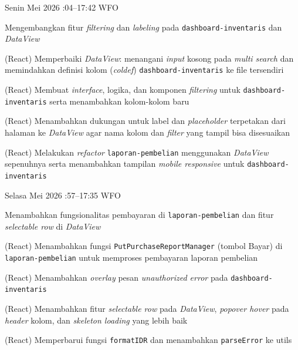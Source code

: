 \begin{logtable}
    {
        Senin  Mei 2026 :04--17:42 \linebreak %
        WFO
    }{
        \begin{loglist}
            \item Mengembangkan fitur \textit{filtering} dan \textit{labeling} pada
            \texttt{dashboard-inventaris} dan \textit{DataView}
        \end{loglist}
    }{
        \begin{logwork}
            \item (React) Memperbaiki \textit{DataView}: menangani \textit{input} kosong pada \textit{multi search} dan memindahkan definisi kolom (\textit{coldef}) \texttt{dashboard-inventaris} ke file tersendiri
            \item (React) Membuat \textit{interface}, logika, dan komponen \textit{filtering} untuk \texttt{dashboard-inventaris} serta menambahkan kolom-kolom baru
            \item (React) Menambahkan dukungan untuk label dan \textit{placeholder} terpetakan dari halaman ke \textit{DataView} agar nama kolom dan \textit{filter} yang tampil bisa disesuaikan
            \item (React) Melakukan \textit{refactor} \texttt{laporan-pembelian} menggunakan \textit{DataView} sepenuhnya serta menambahkan tampilan \textit{mobile responsive} untuk \texttt{dashboard-inventaris}
        \end{logwork}
    }

    {
        Selasa  Mei 2026 :57--17:35 \linebreak %
        WFO
    }{
        \begin{loglist}
            \item Menambahkan fungsionalitas pembayaran di \texttt{laporan-pembelian} dan fitur
            \textit{selectable row} di \textit{DataView}
        \end{loglist}
    }{
        \begin{logwork}
            \item (React) Menambahkan fungsi \texttt{PutPurchaseReportManager} (tombol Bayar) di \texttt{laporan-pembelian} untuk memproses pembayaran laporan pembelian
            \item (React) Menambahkan \textit{overlay} pesan \textit{unauthorized error} pada \texttt{dashboard-inventaris}
            \item (React) Menambahkan fitur \textit{selectable row} pada \textit{DataView}, \textit{popover hover} pada \textit{header} kolom, dan \textit{skeleton loading} yang lebih baik
            \item (React) Memperbarui fungsi \texttt{formatIDR} dan menambahkan \texttt{parseError} ke utils
        \end{logwork}
    }


\end{logtable}
